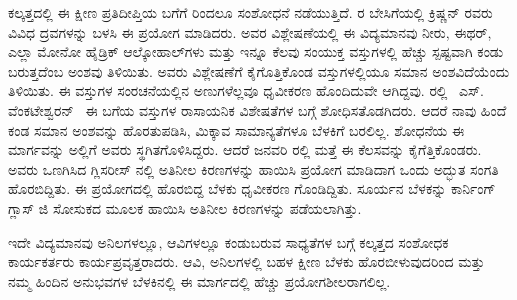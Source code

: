 ಕಲ್ಕತ್ತದಲ್ಲಿ ಈ ಕ್ಷೀಣ ಪ್ರತಿದೀಪ್ತಿಯ ಬಗೆಗೆ  ರಿಂದಲೂ ಸಂಶೋಧನೆ ನಡೆಯುತ್ತಿದೆ. ರ ಬೇಸಿಗೆಯಲ್ಲಿ ಕ್ರಿಷ್ಣನ್ ರವರು  ವಿವಿಧ ದ್ರವಗಳನ್ನು ಬಳಸಿ ಈ ಪ್ರಯೋಗ ಮಾಡಿದರು. ಅವರ ವಿಶ್ಲೇಷಣೆಯಲ್ಲಿ ಈ ವಿದ್ಯಮಾನವು ನೀರು, ಈಥರ್, ಎಲ್ಲಾ ಮೋನೋ ಹೈಡ್ರಿಕ್ ಆಲ್ಕೋಹಾಲ್‌ಗಳು ಮತ್ತು ಇನ್ನೂ ಕೆಲವು ಸಂಯುಕ್ತ ವಸ್ತುಗಳಲ್ಲಿ ಹೆಚ್ಚು ಸ್ಪಷ್ಟವಾಗಿ ಕಂಡು ಬರುತ್ತದೆಂಬ ಅಂಶವು ತಿಳಿಯಿತು. ಅವರು ವಿಶ್ಲೇಷಣೆಗೆ ಕೈಗೊತ್ತಿಕೊಂಡ ವಸ್ತುಗಳಲ್ಲಿಯೂ ಸಮಾನ ಅಂಶವಿದೆಯೆಂದು ತಿಳಿಯಿತು. ಈ ವಸ್ತುಗಳ ಸಂರಚನೆಯಲ್ಲಿನ ಅಣುಗಳೆಲ್ಲವೂ ಧೃವೀಕರಣ ಹೊಂದಿದುವೇ ಆಗಿದ್ದವು. ರಲ್ಲಿ~ ಎಸ್. ವೆಂಕಟೇಶ್ವರನ್ ~ಈ ಬಗೆಯ ವಸ್ತುಗಳ ರಾಸಾಯನಿಕ ವಿಶೇಷತೆಗಳ ಬಗ್ಗೆ \break ಶೋಧಿಸತೊಡಗಿದರು. ಆದರೆ ನಾವು ಹಿಂದೆ ಕಂಡ ಸಮಾನ ಅಂಶವನ್ನು ಹೊರತುಪಡಿಸಿ, ಮಿಕ್ಕಾವ ಸಾಮಾನ್ಯತೆಗಳೂ ಬೆಳಕಿಗೆ ಬರಲಿಲ್ಲ. ಶೋಧನೆಯ ಈ ಮಾರ್ಗವನ್ನು ಅಲ್ಲಿಗೆ ಅವರು ಸ್ಥಗಿತಗೊಳಿಸಿದ್ದರು. ಆದರೆ ಜನವರಿ ರಲ್ಲಿ ಮತ್ತೆ ಈ ಕೆಲಸವನ್ನು ಕೈಗೆತ್ತಿಕೊಂಡರು. ಅವರು ಒಣಗಿಸಿದ ಗ್ಲಿಸರೀಸ್ ನಲ್ಲಿ ಅತಿನೀಲ ಕಿರಣಗಳನ್ನು ಹಾಯಿಸಿ ಪ್ರಯೋಗ ಮಾಡಿದಾಗ ಒಂದು ಅದ್ಭುತ ಸಂಗತಿ ಹೊರಬಿದ್ದಿತು. ಈ ಪ್ರಯೋಗದಲ್ಲಿ ಹೊರಬಿದ್ದ ಬೆಳಕು ಧೃವೀಕರಣ ಗೊಂಡಿದ್ದಿತು. ಸೂರ್ಯನ ಬೆಳಕನ್ನು ಕಾರ್ನಿಂಗ್ ಗ್ಲಾಸ್ ಜಿ\enginline{-} ಸೋಸುಕದ ಮೂಲಕ ಹಾಯಿಸಿ ಅತಿನೀಲ ಕಿರಣಗಳನ್ನು ಪಡೆಯಲಾಗಿತ್ತು.

ಇದೇ ವಿದ್ಯಮಾನವು ಅನಿಲಗಳಲ್ಲೂ, ಆವಿಗಳಲ್ಲೂ ಕಂಡುಬರುವ ಸಾಧ್ಯತೆಗಳ ಬಗ್ಗೆ ಕಲ್ಕತ್ತದ ಸಂಶೋಧಕ ಕಾರ್ಯಕರ್ತರು ಕಾರ್ಯಪ್ರವೃತ್ತರಾದರು. ಆವಿ, ಅನಿಲಗಳಲ್ಲಿ ಬಹಳ ಕ್ಷೀಣ ಬೆಳಕು ಹೊರಬೀಳುವುದರಿಂದ ಮತ್ತು ನಮ್ಮ ಹಿಂದಿನ ಅನುಭವಗಳ ಬೆಳಕಿನಲ್ಲಿ ಈ ಮಾರ್ಗದಲ್ಲಿ ಹೆಚ್ಚು ಪ್ರಯೋಗಶೀಲರಾಗಲಿಲ್ಲ.



